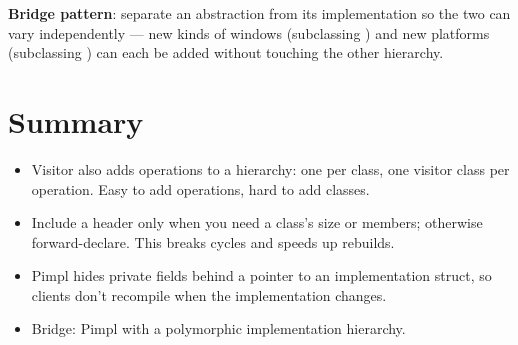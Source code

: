 \begin{definition}
\textbf{Bridge pattern}: separate an abstraction from its implementation so the
two can vary independently --- new kinds of windows (subclassing
) and new platforms (subclassing ) can each be
added without touching the other hierarchy.
\end{definition}

\section*{Summary}
\begin{itemize}
  \item Visitor also adds operations to a hierarchy: one  per class,
        one visitor class per operation. Easy to add operations, hard to add
        classes.
  \item Include a header only when you need a class's size or members; otherwise
        forward-declare. This breaks cycles and speeds up rebuilds.
  \item Pimpl hides private fields behind a pointer to an implementation struct,
        so clients don't recompile when the implementation changes.
  \item Bridge: Pimpl with a polymorphic implementation hierarchy.
\end{itemize}
